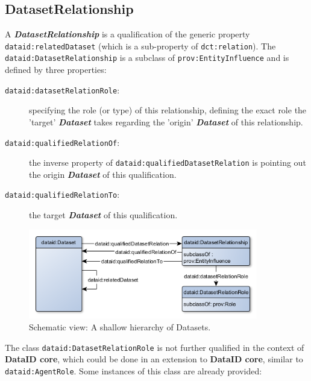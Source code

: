 \documentclass[a4paper,english,twoside,BCOR1.5cm,headsepline,DIV12,appendixprefix,final,12pt]{scrbook}
\newcommand{\core}{{\ttfamily\bfseries DataID core}\xspace}
\newcommand{\prop}[1]{{{\texttt{#1}}}}
\newcommand{\important}[1]{\textbf{\textit{#1}}}
\begin{document}
\subsection{DatasetRelationship} 
\label{sec:corerelation}
A \important{DatasetRelationship} is a qualification of the generic property \prop{dataid:relatedDataset} (which is a sub-property of \prop{dct:relation}). The \prop{dataid:DatasetRelationship} is a subclass of \prop{prov:EntityInfluence} and is defined by three properties:

\begin{description}
\item[\prop{dataid:datasetRelationRole}:] specifying the role (or type) of this relationship, defining the exact role the 'target' \important{Dataset} takes regarding the 'origin' \important{Dataset} of this relationship.
\item[\prop{dataid:qualifiedRelationOf}:] the inverse property of \prop{dataid:qualifiedDatasetRelation} is pointing out the origin \important{Dataset} of this qualification.
\item[\prop{dataid:qualifiedRelationTo}:] the target \important{Dataset} of this qualification.
\end{description}

\begin{figure}[!htbp]
\centering
  \includegraphics[width=10cm]{images/ClassDatasetRelationship.png}
  \caption{Schematic view: A shallow hierarchy of Datasets.}
  \label{fig:example}
\end{figure}

The class \prop{dataid:DatasetRelationRole} is not further qualified in the context of \core, which could be done in an extension to \core, similar to \prop{dataid:AgentRole}. Some instances of this class are already provided:
\end{document}
